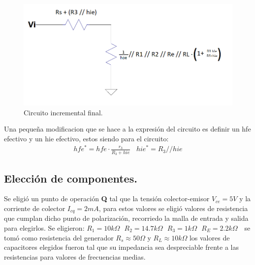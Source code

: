 \documentclass[a4paper]{article}
\begin{document}
\begin{figure} [H]
	\centering
	\includegraphics[width=\textwidth]{imagenes/circinc2.png}
	\caption{Circuito incremental final.}
	\label{fig:circinc2}
\end{figure}
Una pequeña modificacion que se hace a la expresión del circuito es definir un hfe efectivo y un hie efectivo, estos siendo para el circuito:
\begin{align} hfe^* = hfe\cdot \frac{r_3}{R_3+hie} \ \ \ \ hie^* = R_3 // hie \end{align}
\subsection{Elección de componentes.}
Se eligió un punto de operación \textbf{Q} tal que la tensión colector-emisor $V_{ce} = 5 V$ y la corriente de colector $I_{cq} = 2mA$, para estos valores se eligió valores de resistencia que cumplan dicho punto de polarización, recorriedo la malla de entrada y salida para elegirlos. Se eligieron:
$R_1 = 10k\Omega \ \ \ R_2 = 14.7 k\Omega \ \ \ R_3 = 1 k\Omega \ \ \ R_E = 2.2k\Omega \ \ \ $
se tomó como resistencia del generador $R_s \approx 50 \Omega$ y $R_L \approx 10k\Omega $ los valores de capacitores elegidos fueron tal que su impedancia sea despreciable frente a las resistencias para valores de frecuencias medias.
\end{document}
